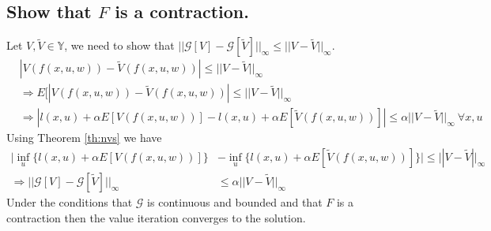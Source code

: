\documentclass[lecture,12pt,]{pcms-l}
\begin{document}
\subsection{Show that $F$ is a contraction.}
Let $V,\tilde{V}\in\mathbb{Y}$, we need to show that $||\mathcal{G}[V]-\mathcal{G}[\tilde{V}]||_\infty \leq ||V-\tilde{V}||_\infty$.
\begin{align*}
&|V(f(x,u,w)) - \tilde{V}(f(x,u,w))| \leq ||V-\tilde{V}||_\infty \\
&\Rightarrow E[|V(f(x,u,w)) - \tilde{V}(f(x,u,w))| \leq ||V-\tilde{V}||_\infty \\
&\Rightarrow |l(x,u)+\alpha E[V(f(x,u,w))] - l(x,u)+\alpha E[\tilde{V}(f(x,u,w))]| \leq \alpha||V-\tilde{V}||_\infty ~\forall x,u
\end{align*}
Using Theorem \ref{th:nvs} we have
\begin{align*}
|\inf_u\{l(x,u)+\alpha E[V(f(x,u,w))]\} &- \inf_u\{l(x,u)+\alpha E[\tilde{V}(f(x,u,w))]\}| \leq ||V-\tilde{V}||_\infty \\
\Rightarrow ||\mathcal{G}[V]-\mathcal{G}[\tilde{V}]||_\infty &\leq \alpha||V-\tilde{V}||_\infty
\end{align*}
Under the conditions that $\mathcal{G}$ is continuous and bounded and that $F$ is a contraction then the value iteration converges to the solution.
\end{document}

